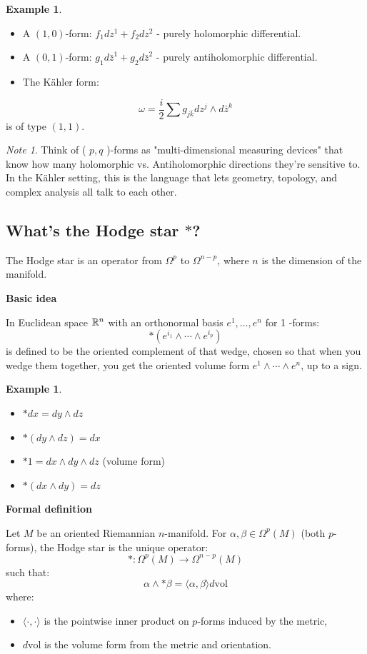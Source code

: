\documentclass{amsart}
\let\originalmathbb\mathbb
\renewcommand{\mathbb}[1]{%
    \ifstrequal{#1}{1}{\mathbbm{#1}}{\originalmathbb{#1}}%
}
\theoremstyle{plain}
\theoremstyle{definition}
\newtheorem{example}[theorem]{Example}
\theoremstyle{remark}
\newtheorem{note}[theorem]{Note}
\begin{document}
\begin{example}
\begin{itemize}
		\item A $(1,0)$-form: $f_1 d z^1+f_2 d z^2$ - purely holomorphic differential.
		\item A $(0,1)$-form: $g_1 d \bar{z}^1+g_2 d \bar{z}^2$ - purely antiholomorphic differential.
		\item The Kähler form:
	\end{itemize}
\[
\omega=\frac{i}{2} \sum g_{j \bar{k}} d z^j \wedge d \bar{z}^k
\]is of type $(1,1)$.
\end{example}
\begin{note}
Think of ( $p, q$ )-forms as "multi-dimensional measuring devices" that know how many holomorphic vs. Antiholomorphic directions they're sensitive to. In the Kähler setting, this is the language that lets geometry, topology, and complex analysis all talk to each other.
\end{note}
\subsection{What's the Hodge star \texorpdfstring{$*$}{*}?}

The Hodge star is an operator from $\Omega^{p}$ to $\Omega^{n-p}$, where $n$ is the dimension of the manifold.

\textbf{Basic idea}

In Euclidean space $\mathbb{R}^n$ with an orthonormal basis $e^1, \ldots, e^n$ for 1 -forms:
\[
*\left(e^{i_1} \wedge \cdots \wedge e^{i_p}\right)
\]
is defined to be the oriented complement of that wedge, chosen so that when you wedge them together, you get the oriented volume form $e^1 \wedge \cdots \wedge e^n$, up to a sign.

\begin{example}
\begin{itemize}
		\item $* d x=d y \wedge d z$
		\item $*(d y \wedge d z)=d x$
		\item $* 1=d x \wedge d y \wedge d z$ (volume form)
		\item $*(d x \wedge d y)=d z$
	\end{itemize}
\end{example}
\textbf{Formal definition}

Let $M$ be an oriented Riemannian $n$-manifold. For $\alpha, \beta \in \Omega^p(M)$ (both $p$-forms), the Hodge star is the unique operator:
\[
*: \Omega^p(M) \rightarrow \Omega^{n-p}(M)
\]
such that:
\[
\alpha \wedge * \beta=\langle\alpha, \beta\rangle d \mathrm{vol}
\]
where:

\begin{itemize}
	\item $\langle\cdot, \cdot\rangle$ is the pointwise inner product on $p$-forms induced by the metric,
	\item $d\text{vol}$ is the volume form from the metric and orientation.
\end{itemize}
\end{document}
